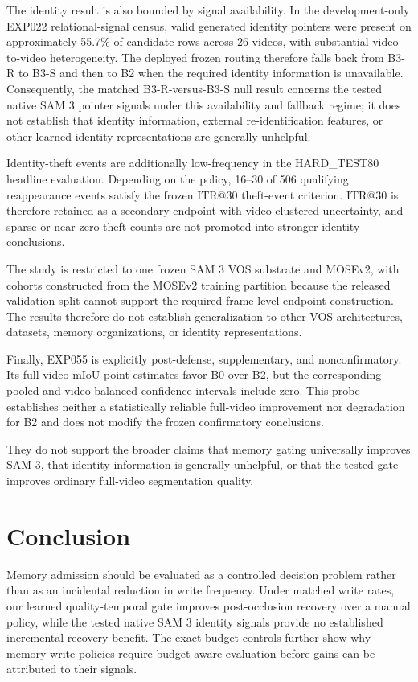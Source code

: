 \documentclass[10pt,twocolumn,letterpaper]{article}
\begin{document}
The identity result is also bounded by signal availability.  In the
development-only EXP022 relational-signal census, valid generated identity
pointers were present on approximately 55.7\% of candidate rows across
26 videos, with substantial video-to-video heterogeneity.  The deployed
frozen routing therefore falls back from B3-R to B3-S and then to B2 when
the required identity information is unavailable.  Consequently, the
matched B3-R-versus-B3-S null result concerns the tested native SAM 3
pointer signals under this availability and fallback regime; it does not
establish that identity information, external re-identification features,
or other learned identity representations are generally unhelpful.

Identity-theft events are additionally low-frequency in the HARD\_TEST80
headline evaluation.  Depending on the policy, 16--30 of 506 qualifying
reappearance events satisfy the frozen ITR@30 theft-event criterion.
ITR@30 is therefore retained as a secondary endpoint with video-clustered
uncertainty, and sparse or near-zero theft counts are not promoted into
stronger identity conclusions.

The study is restricted to one frozen SAM 3 VOS substrate and MOSEv2, with
cohorts constructed from the MOSEv2 training partition because the released
validation split cannot support the required frame-level endpoint
construction.  The results therefore do not establish generalization to
other VOS architectures, datasets, memory organizations, or identity
representations.

Finally, EXP055 is explicitly post-defense, supplementary, and
nonconfirmatory.  Its full-video mIoU point estimates favor B0 over B2, but
the corresponding pooled and video-balanced confidence intervals include
zero.  This probe establishes neither a statistically reliable full-video
improvement nor degradation for B2 and does not modify the frozen
confirmatory conclusions.

They do not support the broader claims that memory gating universally
improves SAM 3, that identity information is generally unhelpful, or that
the tested gate improves ordinary full-video segmentation quality.

\section{Conclusion}
\label{sec:conclusion}

Memory admission should be evaluated as a controlled decision problem rather
than as an incidental reduction in write frequency.
Under matched write rates, our learned quality-temporal gate improves
post-occlusion recovery over a manual policy, while the tested native SAM 3
identity signals provide no established incremental recovery benefit.
The exact-budget controls further show why memory-write policies require
budget-aware evaluation before gains can be attributed to their signals.



\end{document}
